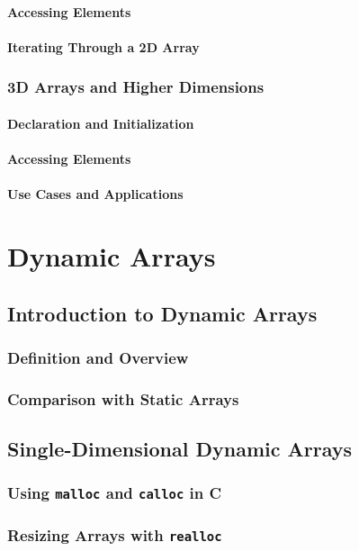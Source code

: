 \documentclass[12pt, oneside]{book}
\begin{document}
	\subsubsection{Accessing Elements}
	\subsubsection{Iterating Through a 2D Array}
	\subsection{3D Arrays and Higher Dimensions}
	\subsubsection{Declaration and Initialization}
	\subsubsection{Accessing Elements}
	\subsubsection{Use Cases and Applications}
	
\chapter{Dynamic Arrays}
	\section{Introduction to Dynamic Arrays}
	\subsection{Definition and Overview}
	\subsection{Comparison with Static Arrays}
	
	\section{Single-Dimensional Dynamic Arrays}
	\subsection{Using \texttt{malloc} and \texttt{calloc} in C}
	\subsection{Resizing Arrays with \texttt{realloc}}
\end{document}
